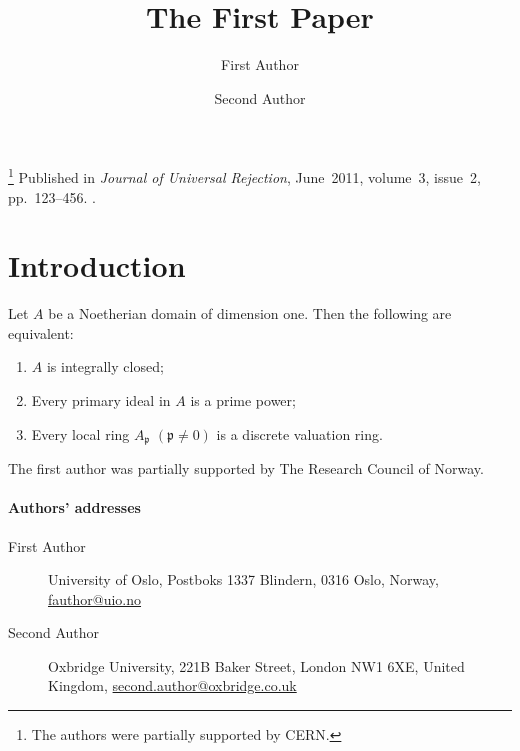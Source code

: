 \author
{
    First Author
    \and
    Second Author
}
\title{The First Paper}
\thanks{The authors were partially supported by CERN.}
\metadata
{
    Published in \emph{Journal of Universal Rejection},
    June~2011,
    volume~3,
    issue~2,
    pp.~123--456.
    .
}
\maketitle
\label{pap:first}

\begin{abstract}
    \kant[7]     %
\end{abstract}

\startcontents[chapters]

\section{Introduction}

\kant[8-11]      %

\begin{theorem}[{\cite[95]{AM69}}]
    \label{thm:dedekind}
    Let \( A \) be a Noetherian domain of dimension one. Then the following are equivalent:
    \begin{enumerate}
        \item
        \( A \) is integrally closed;

        \item
        Every primary ideal in \( A \) is a prime power;

        \item
        Every local ring \( A_\mathfrak{p} \) \( (\mathfrak{p} \neq 0) \) is a discrete valuation ring.
    \end{enumerate}
\end{theorem}

\begin{acknowledgements}
    The first author was partially supported by The Research Council of Norway.
\end{acknowledgements}

\stopcontents[chapters]

\paragraph{Authors' addresses}
\begin{description}
    \item[First Author]
    University of Oslo,
    Postboks 1337 Blindern, 0316 Oslo, Norway,
    \href{mailto:fauthor@uio.no}{fauthor@uio.no}

    \item[Second Author]
    Oxbridge University,
    221B Baker Street, London NW1 6XE, United Kingdom,
    \href{mailto:second.author@oxbridge.co.uk}{second.author@oxbridge.co.uk}
\end{description}